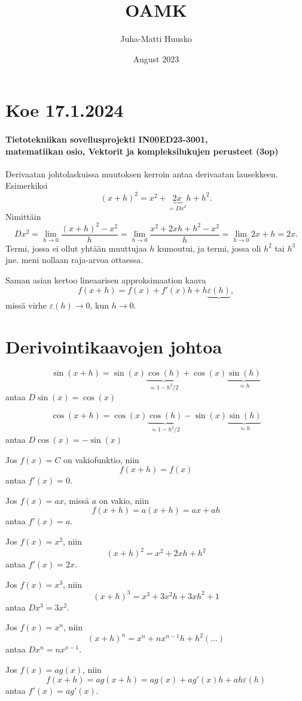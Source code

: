 \documentclass[12pt]{article}
\title{OAMK}
\author{Juha-Matti Huusko}
\date{August 2023}
\begin{document}
\thispagestyle{empty}

\section*{Koe 17.1.2024}
\paragraph*{Tietotekniikan sovellusprojekti IN00ED23-3001,\\ matematiikan osio, Vektorit ja kompleksilukujen perusteet (3op)}

Derivaatan johtolaskuissa muutoksen kerroin antaa derivaatan lausekkeen. Esimerkiksi
$$
(x+h)^2=x^2+\underbrace{2x}_{=D x^2}h+h^2.
$$
Nimittäin
$$
D x^2=\lim_{h\to 0}\frac{(x+h)^2-x^2}{h}
=\lim_{h\to 0}\frac{x^2+2xh+h^2-x^2}{h}
=\lim_{h\to 0}2x+h=2x.
$$
Termi, jossa ei ollut yhtään muuttujaa $h$ kumoutui, ja termi, jossa oli $h^2$ tai $h^3$ jne. meni nollaan raja-arvoa ottaessa.

Saman asian kertoo lineaarisen approksimaation kaava
$$
f(x+h)=f(x)+f'(x)h+h\underbrace{\varepsilon(h)},
$$
missä virhe $\varepsilon(h)\to 0$, kun $h\to 0$.

\section{Derivointikaavojen johtoa}

$$
\sin(x+h)=\sin(x)\underbrace{\cos(h)}_{\approx 1-h^2/2}
+\cos(x)\underbrace{\sin(h)}_{\approx h}
$$
antaa $D\sin(x)=\cos(x)$

$$
\cos(x+h)=\cos(x)\underbrace{\cos(h)}_{\approx 1-h^2/2}-\sin(x)\underbrace{\sin(h)}_{\approx h}
$$
antaa $D\cos(x)=-\sin(x)$

Jos $f(x)=C$ on vakiofunktio, niin
$$
f(x+h)=f(x)
$$
antaa $f'(x)=0$.

Jos $f(x)=ax$, missä $a$ on vakio, niin
$$
f(x+h)=a(x+h)=ax+ah
$$
antaa $f'(x)=a$.

Jos $f(x)=x^2$, niin
$$
(x+h)^2=x^2+2xh+h^2
$$
antaa $f'(x)=2x$.

Jos $f(x)=x^3$, niin
$$
(x+h)^3=x^3+3x^2h+3xh^2+1
$$
antaa $D x^3=3x^2$.

Jos $f(x)=x^n$, niin
$$
(x+h)^n=x^n+nx^{n-1}h+h^2(\ldots)
$$
antaa $D x^n=nx^{x-1}$.

Jos $f(x)=ag(x)$, niin
$$
f(x+h)=ag(x+h)=ag(x)+ag'(x)h+ah\varepsilon(h)
$$
antaa $f'(x)=ag'(x)$.
\end{document}
